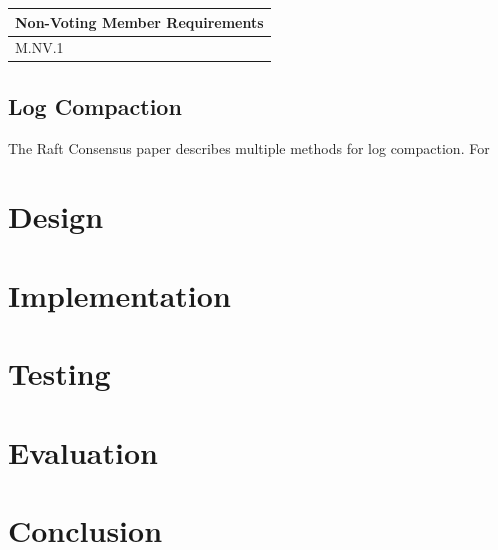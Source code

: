 \documentclass{article}
\begin{document}
    \noindent \begin{tabular}{|p{}|p{}|}
        \hline
        \multicolumn{2}{|c|}{Non-Voting Member Requirements}  \\ \hline
        M.NV.1 &
    \end{tabular}
    \subsection{Log Compaction}
    The Raft Consensus paper describes multiple methods for log compaction. For 

\section{Design}

\section{Implementation}

\section{Testing}

\section{Evaluation}

\section{Conclusion}



\end{document}
